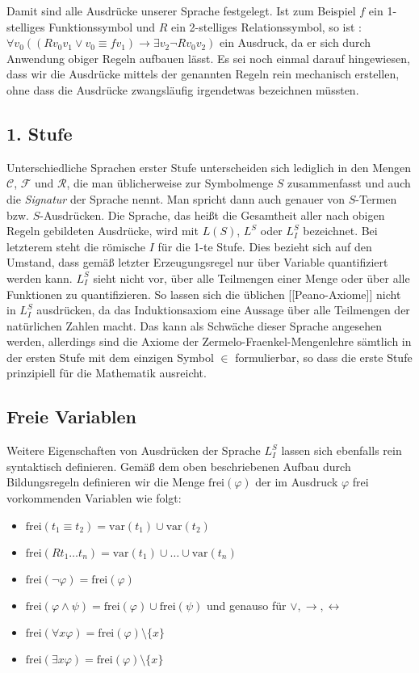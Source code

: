 Damit sind alle Ausdrücke unserer Sprache festgelegt. Ist zum Beispiel $f$ ein 1-stelliges Funktionssymbol und $R$ ein 2-stelliges Relationssymbol, so ist
: $\forall v_0((Rv_0v_1\lor v_0\equiv fv_1) \rightarrow \exists v_2 \neg Rv_0v_2)$
ein Ausdruck, da er sich durch Anwendung obiger Regeln aufbauen lässt. Es sei noch einmal darauf hingewiesen, dass wir die Ausdrücke mittels der genannten Regeln rein mechanisch erstellen, ohne dass die Ausdrücke zwangsläufig irgendetwas bezeichnen müssten.

\subsection{1. Stufe}
Unterschiedliche Sprachen erster Stufe unterscheiden sich lediglich in den Mengen $\mathcal C$, $\mathcal F$ und $\mathcal R$, die man üblicherweise zur Symbolmenge $S$ zusammenfasst und auch die \textit{Signatur} der Sprache nennt. Man spricht dann auch genauer von $S$-Termen bzw. $S$-Ausdrücken. Die Sprache, das heißt die Gesamtheit aller nach obigen Regeln gebildeten Ausdrücke, wird mit $L(S)$, $L^S$ oder $L_I^S$ bezeichnet. Bei letzterem steht die römische $I$ für die 1-te Stufe. Dies bezieht sich auf den Umstand, dass gemäß letzter Erzeugungsregel nur über Variable quantifiziert werden kann. $L_I^S$ sieht nicht vor, über alle Teilmengen einer Menge oder über alle Funktionen zu quantifizieren. So lassen sich die üblichen [[Peano-Axiome]] nicht in $L_I^S$ ausdrücken, da das Induktionsaxiom eine Aussage über alle Teilmengen der natürlichen Zahlen macht. Das kann als Schwäche dieser Sprache angesehen werden, allerdings sind die Axiome der Zermelo-Fraenkel-Mengenlehre sämtlich in der ersten Stufe mit dem einzigen Symbol $\in$ formulierbar, so dass die erste Stufe prinzipiell für die Mathematik ausreicht.

\subsection{Freie Variablen}
Weitere Eigenschaften von Ausdrücken der Sprache $L_I^S$ lassen sich ebenfalls rein syntaktisch definieren. Gemäß dem oben beschriebenen Aufbau durch Bildungsregeln definieren wir die Menge $\mathrm{frei}(\varphi)$ der im Ausdruck $\varphi$ frei vorkommenden Variablen wie folgt:

\begin{itemize}
	\item $\mathrm{frei}(t_1\equiv t_2) = \mathrm{var}(t_1)\cup \mathrm{var}(t_2)$
	\item $\mathrm{frei}(Rt_1\ldots t_n) = \mathrm{var}(t_1)\cup\ldots \cup \mathrm{var}(t_n)$
	\item $\mathrm{frei}(\neg \varphi) = \mathrm{frei}(\varphi)$
	\item $\mathrm{frei}(\varphi \land \psi) = \mathrm{frei}(\varphi)\cup \mathrm{frei}(\psi)$ und genauso für $\lor, \rightarrow, \leftrightarrow$
	\item $\mathrm{frei}(\forall x\varphi) = \mathrm{frei}(\varphi)\setminus \{x\}$
	\item $\mathrm{frei}(\exists x\varphi) = \mathrm{frei}(\varphi)\setminus \{x\}$
\end{itemize}


